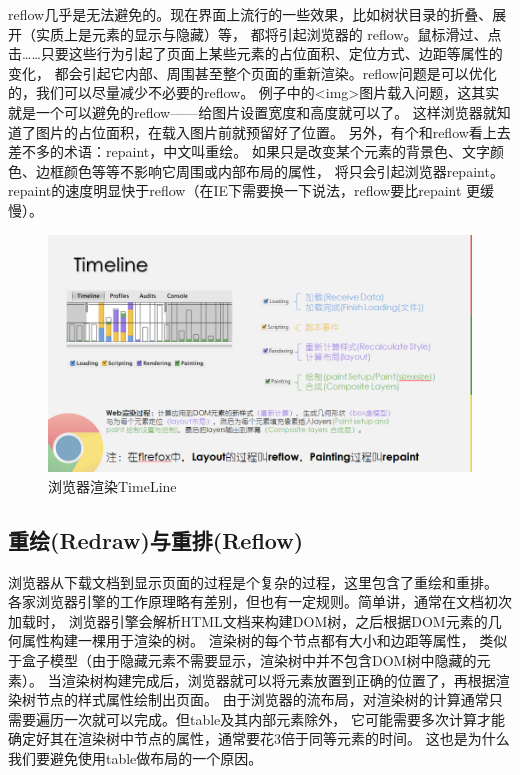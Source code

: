 \documentclass{book}
\begin{document}
reflow几乎是无法避免的。现在界面上流行的一些效果，比如树状目录的折叠、展开（实质上是元素的显示与隐藏）等，
都将引起浏览器的 reflow。鼠标滑过、点击……只要这些行为引起了页面上某些元素的占位面积、定位方式、边距等属性的变化，
都会引起它内部、周围甚至整个页面的重新渲染。reflow问题是可以优化的，我们可以尽量减少不必要的reflow。
例子中的<img>图片载入问题，这其实就是一个可以避免的reflow——给图片设置宽度和高度就可以了。
这样浏览器就知道了图片的占位面积，在载入图片前就预留好了位置。
另外，有个和reflow看上去差不多的术语：repaint，中文叫重绘。
如果只是改变某个元素的背景色、文字颜色、边框颜色等等不影响它周围或内部布局的属性，
将只会引起浏览器repaint。repaint的速度明显快于reflow（在IE下需要换一下说法，reflow要比repaint 更缓慢）。

\begin{figure}[htbp]
	\centering
	\includegraphics[scale=0.5]{ChromeRenderingTimeLine.png}
	\caption{浏览器渲染TimeLine}
	\label{fig:ChromeRenderingTimeLine}
\end{figure}

\subsection{重绘(Redraw)与重排(Reflow)}

浏览器从下载文档到显示页面的过程是个复杂的过程，这里包含了重绘和重排。
各家浏览器引擎的工作原理略有差别，但也有一定规则。简单讲，通常在文档初次加载时，
浏览器引擎会解析HTML文档来构建DOM树，之后根据DOM元素的几何属性构建一棵用于渲染的树。
渲染树的每个节点都有大小和边距等属性，
类似于盒子模型（由于隐藏元素不需要显示，渲染树中并不包含DOM树中隐藏的元素）。
当渲染树构建完成后，浏览器就可以将元素放置到正确的位置了，再根据渲染树节点的样式属性绘制出页面。
由于浏览器的流布局，对渲染树的计算通常只需要遍历一次就可以完成。但table及其内部元素除外，
它可能需要多次计算才能确定好其在渲染树中节点的属性，通常要花3倍于同等元素的时间。
这也是为什么我们要避免使用table做布局的一个原因。
\end{document}
